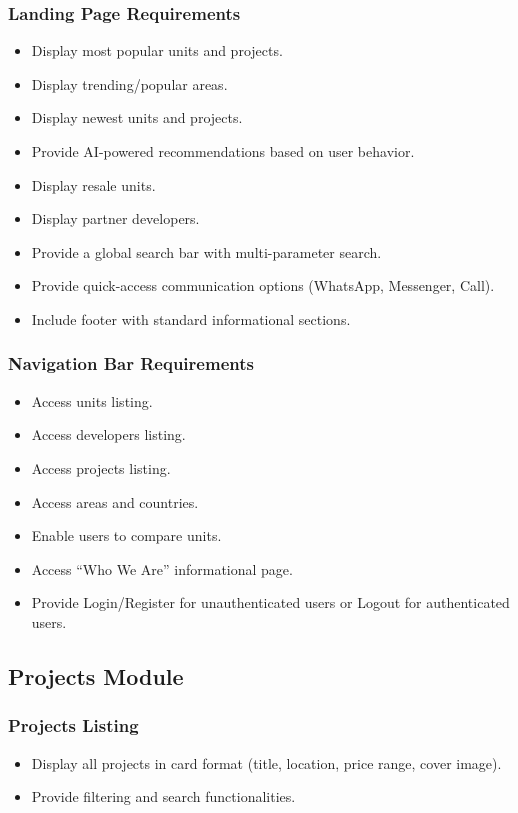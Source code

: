 \documentclass[12pt]{article}
\begin{document}
\subsubsection{Landing Page Requirements}
\begin{itemize}
    \item Display most popular units and projects.
    \item Display trending/popular areas.
    \item Display newest units and projects.
    \item Provide AI-powered recommendations based on user behavior.
    \item Display resale units.
    \item Display partner developers.
    \item Provide a global search bar with multi-parameter search.
    \item Provide quick-access communication options (WhatsApp, Messenger, Call).
    \item Include footer with standard informational sections.
\end{itemize}

\subsubsection{Navigation Bar Requirements}
\begin{itemize}
    \item Access units listing.
    \item Access developers listing.
    \item Access projects listing.
    \item Access areas and countries.
    \item Enable users to compare units.
    \item Access ``Who We Are'' informational page.
    \item Provide Login/Register for unauthenticated users or Logout for authenticated users.
\end{itemize}

\subsection{Projects Module}

\subsubsection{Projects Listing}
\begin{itemize}
    \item Display all projects in card format (title, location, price range, cover image).
    \item Provide filtering and search functionalities.
\end{itemize}
\end{document}
